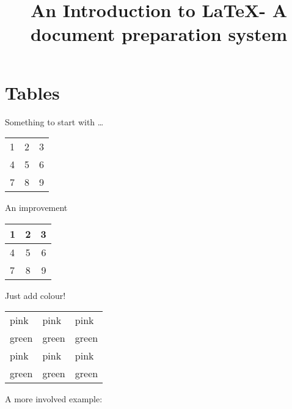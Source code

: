 \documentclass[11pt]{article}
\title{An Introduction to \LaTeX - A document preparation system}
\author{}
\date{}
\begin{document}
\maketitle

\section{Tables}

Something to start with \dots

\vspace{0.5cm}

\begin{tabular}{ l c r }
	1 & 2 & 3 \\
	4 & 5 & 6 \\
	7 & 8 & 9 \\
\end{tabular}

\noindent
An improvement

\begin{center}
	\begin{tabular}{ | l | c | r | }
		\hline
		1 & 2 & 3 \\ \hline
		4 & 5 & 6 \\ \hline
		7 & 8 & 9 \\
		\hline
	\end{tabular}
\end{center}

Just add colour!

\begin{center}
	
	\begin{tabular}{lll}
		pink     & pink  & pink\\
		green    & green  & green\\
		pink    & pink  & pink\\
		green    & green  & green\\
	\end{tabular}
\end{center}

A more involved example:
\end{document}
